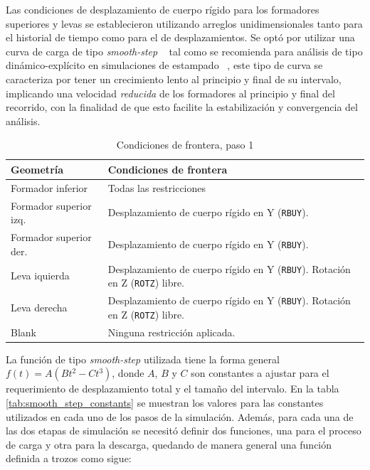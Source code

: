 Las condiciones de desplazamiento de cuerpo rígido para los formadores superiores y levas 
se establecieron utilizando arreglos unidimensionales tanto para el historial de tiempo 
como para el de desplazamientos. Se optó por utilizar una curva de carga de tipo 
\textit{smooth-step} ~\cite{smooth-step-wiki} tal como se recomienda para análisis 
de tipo dinámico-explícito en simulaciones de estampado ~\cite{input-param-lsdyna}, 
este tipo de curva se caracteriza por tener un crecimiento lento al principio y 
final de su intervalo,  implicando una velocidad \textit{reducida} de los formadores al principio y final 
del recorrido, con la finalidad de que esto facilite la estabilización y convergencia
del análisis.

\begin{table}[H]
\centering
\caption{Condiciones de frontera, paso 1}
\label{}
\begin{tabular}{p{4cm} p{8cm}} \hline
Geometría &  Condiciones de frontera \\
\hline
Formador inferior        & Todas las restricciones   \\
Formador superior izq.   & Desplazamiento de cuerpo rígido en Y (\texttt{RBUY}). \\
Formador superior der.   & Desplazamiento de cuerpo rígido en Y (\texttt{RBUY}). \\
Leva iquierda            & Desplazamiento de cuerpo rígido en Y (\texttt{RBUY}). Rotación en Z (\texttt{ROTZ}) libre. \\
Leva derecha             & Desplazamiento de cuerpo rígido en Y (\texttt{RBUY}). Rotación en Z (\texttt{ROTZ}) libre. \\
Blank                    & Ninguna restricción aplicada. \\
\hline
\end{tabular}
\label{tab:bound_conds_01}
\end{table}


La función de tipo \textit{smooth-step} utilizada tiene la forma general $f(t) = A(Bt^2 - Ct^3)$, 
donde $A$, $B$ y $C$ son constantes a ajustar para el requerimiento de desplazamiento total y el 
tamaño del intervalo. En la tabla \ref{tab:smooth_step_constants} se muestran los valores para 
las constantes utilizados en cada uno de los pasos de la simulación. Además, para cada 
una de las dos etapas de simulación se necesitó definir dos funciones, una para el proceso 
de carga y otra para la descarga, quedando de manera general una función definida a trozos como sigue:

